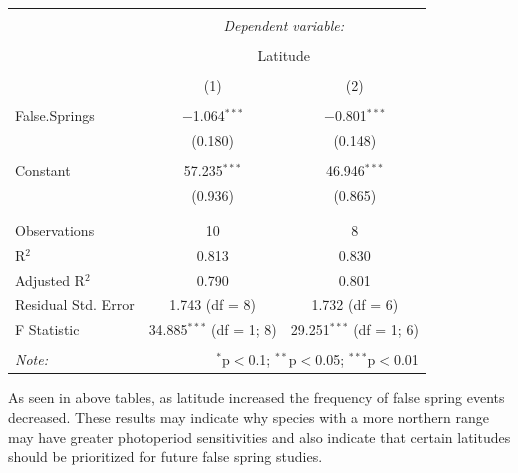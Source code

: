 \documentclass{article}\usepackage[]{graphicx}\usepackage[]{color}
\begin{document}
\begin{table}[!htbp] \centering 
  \caption{} 
  \label{} 
\begin{tabular}{@{\extracolsep{5pt}}lcc} 
\\[-1.8ex]\hline 
\hline \\[-1.8ex] 
 & \multicolumn{2}{c}{\textit{Dependent variable:}} \\ 
\cline{2-3} 
\\[-1.8ex] & \multicolumn{2}{c}{Latitude} \\ 
\\[-1.8ex] & (1) & (2)\\ 
\hline \\[-1.8ex] 
 False.Springs & $-$1.064$^{***}$ & $-$0.801$^{***}$ \\ 
  & (0.180) & (0.148) \\ 
  & & \\ 
 Constant & 57.235$^{***}$ & 46.946$^{***}$ \\ 
  & (0.936) & (0.865) \\ 
  & & \\ 
\hline \\[-1.8ex] 
Observations & 10 & 8 \\ 
R$^{2}$ & 0.813 & 0.830 \\ 
Adjusted R$^{2}$ & 0.790 & 0.801 \\ 
Residual Std. Error & 1.743 (df = 8) & 1.732 (df = 6) \\ 
F Statistic & 34.885$^{***}$ (df = 1; 8) & 29.251$^{***}$ (df = 1; 6) \\ 
\hline 
\hline \\[-1.8ex] 
\textit{Note:}  & \multicolumn{2}{r}{$^{*}$p$<$0.1; $^{**}$p$<$0.05; $^{***}$p$<$0.01} \\ 
\end{tabular} 
\end{table} 


As seen in above tables, as latitude increased the frequency of false spring events decreased. These results may indicate why species with a more northern range may have greater photoperiod sensitivities and also indicate that certain latitudes should be prioritized for future false spring studies. 
\end{document}
